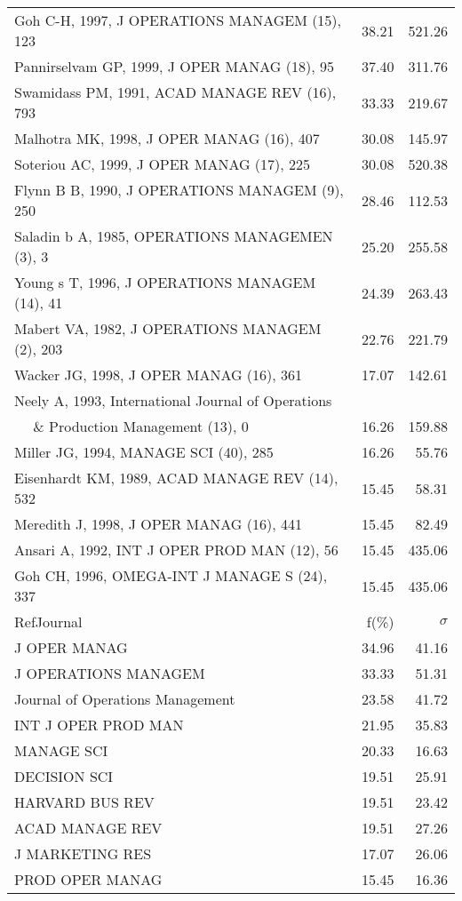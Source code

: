 \documentclass[a4paper,11pt]{report}
\begin{document}
\begin{landscape}
\begin{table}[!ht]
{\begin{tabular}{|l r r|}
Goh C-H, 1997, J OPERATIONS MANAGEM (15), 123 & 38.21 & 521.26\\
Pannirselvam GP, 1999, J OPER MANAG (18), 95 & 37.40 & 311.76\\
Swamidass PM, 1991, ACAD MANAGE REV (16), 793 & 33.33 & 219.67\\
Malhotra MK, 1998, J OPER MANAG (16), 407 & 30.08 & 145.97\\
Soteriou AC, 1999, J OPER MANAG (17), 225 & 30.08 & 520.38\\
Flynn B B, 1990, J OPERATIONS MANAGEM (9), 250 & 28.46 & 112.53\\
Saladin b A, 1985, OPERATIONS MANAGEMEN (3), 3 & 25.20 & 255.58\\
Young s T, 1996, J OPERATIONS MANAGEM (14), 41 & 24.39 & 263.43\\
Mabert VA, 1982, J OPERATIONS MANAGEM (2), 203 & 22.76 & 221.79\\
Wacker JG, 1998, J OPER MANAG (16), 361 & 17.07 & 142.61\\
Neely A, 1993, International Journal of Operations &  & \\
$\quad$ \& Production Management (13), 0 & 16.26 & 159.88\\
Miller JG, 1994, MANAGE SCI (40), 285 & 16.26 & 55.76\\
Eisenhardt KM, 1989, ACAD MANAGE REV (14), 532 & 15.45 & 58.31\\
Meredith J, 1998, J OPER MANAG (16), 441 & 15.45 & 82.49\\
Ansari A, 1992, INT J OPER PROD MAN (12), 56 & 15.45 & 435.06\\
Goh CH, 1996, OMEGA-INT J MANAGE S (24), 337 & 15.45 & 435.06\\
\hline
\hline
RefJournal & f(\%) & $\sigma$\\
\hline
J OPER MANAG & 34.96 & 41.16\\
J OPERATIONS MANAGEM & 33.33 & 51.31\\
Journal of Operations Management & 23.58 & 41.72\\
INT J OPER PROD MAN & 21.95 & 35.83\\
MANAGE SCI & 20.33 & 16.63\\
DECISION SCI & 19.51 & 25.91\\
HARVARD BUS REV & 19.51 & 23.42\\
ACAD MANAGE REV & 19.51 & 27.26\\
J MARKETING RES & 17.07 & 26.06\\
PROD OPER MANAG & 15.45 & 16.36\\
\hline
\end{tabular}
}
\end{table}


\end{landscape}
\end{document}

